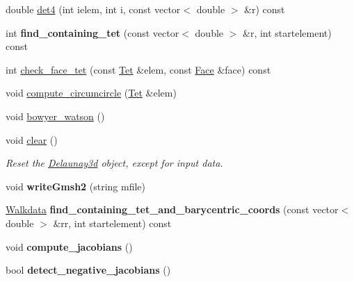 \begin{DoxyCompactItemize}
\item 
double \hyperlink{classDelaunay3d_a757ff79c60a75b78b7441c585252cc0a}{det4} (int ielem, int i, const vector$<$ double $>$ \&r) const 
\item 
\hypertarget{classDelaunay3d_aceecd74eb976c65e5b2fbe6a03e88e1d}{int {\bfseries find\-\_\-containing\-\_\-tet} (const vector$<$ double $>$ \&r, int startelement) const }\label{classDelaunay3d_aceecd74eb976c65e5b2fbe6a03e88e1d}

\item 
int \hyperlink{classDelaunay3d_aab9796c1c3cf7aafb89fdcb407695923}{check\-\_\-face\-\_\-tet} (const \hyperlink{classTet}{Tet} \&elem, const \hyperlink{structFace}{Face} \&face) const 
\item 
void \hyperlink{classDelaunay3d_a1b400eb3465cefeccc300f497eb0616b}{compute\-\_\-circumcircle} (\hyperlink{classTet}{Tet} \&elem)
\item 
void \hyperlink{classDelaunay3d_a7bee4058767627eccd7b1e400ed69f92}{bowyer\-\_\-watson} ()
\item 
\hypertarget{classDelaunay3d_a9ae73ad17b71066c3c6d2dfd94cf9921}{void \hyperlink{classDelaunay3d_a9ae73ad17b71066c3c6d2dfd94cf9921}{clear} ()}\label{classDelaunay3d_a9ae73ad17b71066c3c6d2dfd94cf9921}

\begin{DoxyCompactList}\small\item\em Reset the \hyperlink{classDelaunay3d}{Delaunay3d} object, except for input data. \end{DoxyCompactList}\item 
\hypertarget{classDelaunay3d_a8cece1786c45c77d43bade6d1f081c6a}{void {\bfseries write\-Gmsh2} (string mfile)}\label{classDelaunay3d_a8cece1786c45c77d43bade6d1f081c6a}

\item 
\hypertarget{classDelaunay3d_af6557b81e00a71b8990974c0a5ad1a20}{\hyperlink{structWalkdata}{Walkdata} {\bfseries find\-\_\-containing\-\_\-tet\-\_\-and\-\_\-barycentric\-\_\-coords} (const vector$<$ double $>$ \&rr, int startelement) const }\label{classDelaunay3d_af6557b81e00a71b8990974c0a5ad1a20}

\item 
\hypertarget{classDelaunay3d_a4751319429c34ae060834a9942b28f5e}{void {\bfseries compute\-\_\-jacobians} ()}\label{classDelaunay3d_a4751319429c34ae060834a9942b28f5e}

\item 
\hypertarget{classDelaunay3d_ae2c595128a16dcdc725a8fe10f44fc47}{bool {\bfseries detect\-\_\-negative\-\_\-jacobians} ()}\label{classDelaunay3d_ae2c595128a16dcdc725a8fe10f44fc47}

\end{DoxyCompactItemize}
